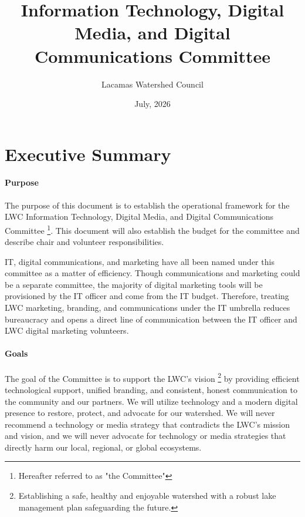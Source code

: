 \documentclass[letterpaper,11pt,leqno]{article}
\begin{document}
\title{Information Technology, Digital Media, and Digital Communications Committee}

\author{Lacamas Watershed Council}

\date{July, 2026}


\begin{titlepage}
\maketitle


\end{titlepage}

\section{Executive Summary}\label{s:summary}

\paragraph{Purpose} The purpose of this document is to establish the operational framework for the LWC Information Technology, Digital Media, and Digital Communications Committee \footnote{Hereafter referred to as "the Committee"}.
This document will also establish the budget for the committee and describe chair and volunteer responsibilities.

IT, digital communications, and marketing have all been named under this committee as a matter of efficiency.
Though communications and marketing could be a separate committee, the majority of digital marketing tools will be provisioned by the IT officer and come from the IT budget. Therefore, treating LWC marketing, branding, and communications
under the IT umbrella reduces bureaucracy and opens a direct line of communication between the IT officer and LWC digital marketing volunteers.

\paragraph{Goals} The goal of the Committee is to support the LWC's vision \footnote{Establishing a safe, healthy and enjoyable watershed with a robust lake management plan safeguarding the future.} by providing efficient technological support, unified branding,
and consistent, honest communication to the community and our partners. We will utilize technology and a modern digital presence to restore, protect, and advocate for our watershed. We will never recommend a technology or media strategy that contradicts the LWC's mission and vision, and
we will never advocate for technology or media strategies that directly harm our local, regional, or global ecosystems.
\end{document}

